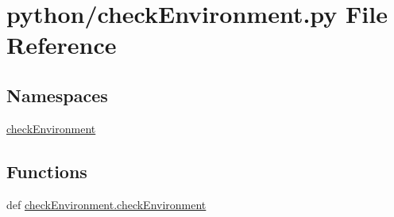 \section{python/check\-Environment.py File Reference}
\label{checkEnvironment_8py}
\subsection*{Namespaces}
\begin{DoxyCompactItemize}
\item 
\hyperlink{namespacecheckEnvironment}{check\-Environment}
\end{DoxyCompactItemize}
\subsection*{Functions}
\begin{DoxyCompactItemize}
\item 
def \hyperlink{namespacecheckEnvironment_a126b12d3e0eaeab82e59b2bd7e1a3e73}{check\-Environment.\-check\-Environment}
\end{DoxyCompactItemize}
